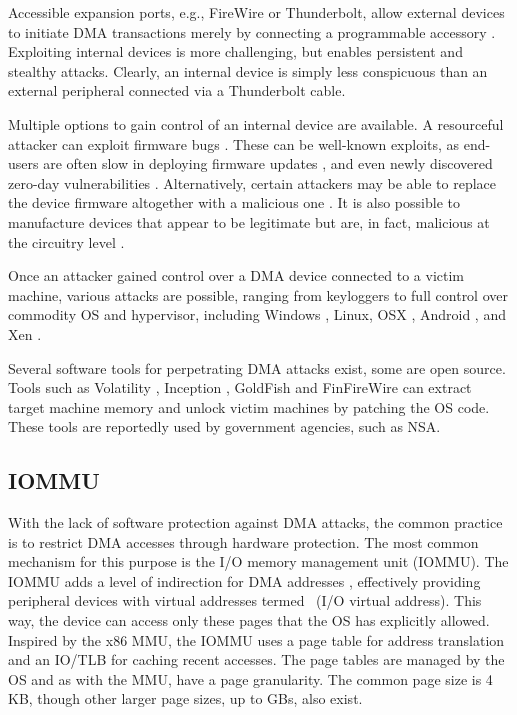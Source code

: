 Accessible expansion ports, e.g., FireWire or Thunderbolt, allow external devices to initiate DMA transactions merely by connecting a programmable accessory \cite{Dor04, Vol, MM, thunder}. 
Exploiting internal devices is more challenging, but enables persistent and stealthy attacks. Clearly, an internal device is simply less conspicuous than an external peripheral connected via a Thunderbolt cable.

Multiple options to gain control of an internal device are available.
A resourceful attacker can exploit firmware bugs \cite{SB12}. These can be well-known exploits, as end-users are often slow in deploying firmware updates \cite{DPVL10}, and even newly discovered zero-day vulnerabilities \cite{Ben17b}. Alternatively, certain attackers may be able to replace the device firmware altogether with a malicious one \cite{ZKB13, NL14}. It is also possible to manufacture devices that appear to be legitimate but are, in fact, malicious at the circuitry level \cite{YHD16}.

Once an attacker gained control over a DMA device connected to a victim machine, various attacks are possible, ranging from keyloggers \cite{LKV13, SB12} to full control over commodity OS and hypervisor, including Windows \cite{AD10,thunder}, Linux, OSX \cite{Fri16, thunder}, Android \cite{Ben17b}, and Xen \cite{Woj08}.

Several software tools for perpetrating DMA attacks exist, some are open source. Tools such as Volatility \cite{Vol}, Inception \cite{MM}, GoldFish \cite{GA10} and FinFireWire \cite{Fin14} can extract target machine memory and unlock victim machines by patching the OS code. These tools are reportedly used by government agencies, such as NSA.

\subsection{IOMMU}

With the lack of software protection against DMA attacks, the common practice is to restrict DMA accesses through hardware protection. The most common mechanism for this purpose is the I/O memory management unit (IOMMU). The IOMMU adds a level of indirection for DMA addresses \cite{WRC08,YZ15,SB12,MTF12}, effectively providing peripheral devices with virtual addresses termed~\iova{} (I/O virtual address). This way, the device can access only these pages that the OS has explicitly allowed. Inspired by the x86 MMU, the IOMMU uses a page table for address translation and an IO/TLB for caching recent accesses.  The page tables are managed by the OS and as with the MMU, have a page granularity. The common page size is 4\,KB, though other larger page sizes, up to GBs, also exist.

